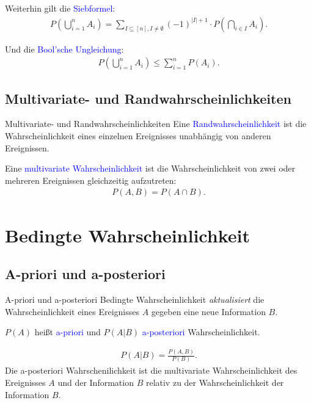 \documentclass{beamer}
\def\padding{\vspace{0.5cm}}
\def\spadding{\vspace{0.25cm}}
\def\b{\textcolor{blue}}
\begin{document}
\begin{frame}
    Weiterhin gilt die \b{Siebformel}:
    \begin{align*}
        P(\bigcup_{i=1}^n A_i) = \sum_{I \subseteq [n], I \neq \emptyset} (-1)^{|I| + 1} \cdot P(\bigcap_{i \in I} A_i).
    \end{align*}\pause\par\padding
    Und die \b{Bool'sche Ungleichung}:
    \begin{align*}
        P(\bigcup_{i=1}^n A_i) \leq \sum_{i=1}^n P(A_i).
    \end{align*}
\end{frame}

\subsection{Multivariate- und Randwahrscheinlichkeiten}
\begin{frame}{Multivariate- und Randwahrscheinlichkeiten}
    Eine \b{Randwahrscheinlichkeit} ist die Wahrscheinlichkeit eines einzelnen Ereignisses unabhängig von anderen Ereignissen.\pause\par\spadding
    Eine \b{multivariate Wahrscheinlichkeit} ist die Wahrscheinlichkeit von zwei oder mehreren Ereignissen gleichzeitig aufzutreten:
    \begin{align*}
        P(A,B) = P(A \cap B).
    \end{align*}
\end{frame}

\section{Bedingte Wahrscheinlichkeit}
\subsection{A-priori und a-posteriori}
\begin{frame}{A-priori und a-posteriori}
    Bedingte Wahrscheinlichkeit \textit{aktualisiert} die Wahrscheinlichkeit eines Ereignisses $A$ gegeben eine neue Information $B$.\pause\par\padding
    $P(A)$ heißt \b{a-priori} und $P(A|B)$ \b{a-posteriori} Wahrscheinlichkeit.\pause\par\padding
    \begin{align*}
        P(A|B) = \frac{P(A,B)}{P(B)}.
    \end{align*}
    Die a-posteriori Wahrschenilichkeit ist die multivariate Wahrscheinlichkeit des Ereignisses $A$ und der Information $B$ relativ zu der Wahrscheinlichkeit der Information $B$.
\end{frame}
\end{document}
